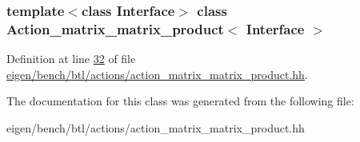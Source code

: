 \subsubsection*{template$<$class Interface$>$\newline
class Action\+\_\+matrix\+\_\+matrix\+\_\+product$<$ Interface $>$}



Definition at line \hyperlink{eigen_2bench_2btl_2actions_2action__matrix__matrix__product_8hh_source_l00032}{32} of file \hyperlink{eigen_2bench_2btl_2actions_2action__matrix__matrix__product_8hh_source}{eigen/bench/btl/actions/action\+\_\+matrix\+\_\+matrix\+\_\+product.\+hh}.



The documentation for this class was generated from the following file\+:\begin{DoxyCompactItemize}
\item 
eigen/bench/btl/actions/action\+\_\+matrix\+\_\+matrix\+\_\+product.\+hh\end{DoxyCompactItemize}
